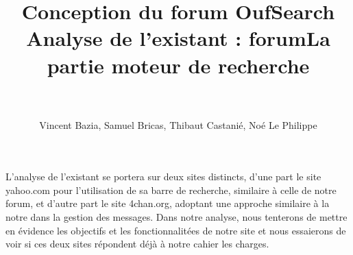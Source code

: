 \documentclass [a4 paper,11pt]{report}
\title{\textbf{Conception du forum OufSearch}\\Analyse de l'existant : forum}
\author{Vincent Bazia, Samuel Bricas, Thibaut Castanié, Noé Le Philippe}
\date{}
\begin{document}
\maketitle
\newpage
\paragraph{}
L'analyse de l'existant se portera sur deux sites distincts, d'une part le site yahoo.com pour l'utilisation de sa barre de recherche, similaire à celle de notre forum, et d'autre part le site 4chan.org, adoptant une approche similaire à la notre dans la gestion des messages. Dans notre analyse, nous tenterons de mettre en évidence les objectifs et les fonctionnalitées de notre site et nous essaierons de voir si ces deux sites répondent déjà à notre cahier les charges.
\paragraph{}
\title{\textbf{La partie moteur de recherche \\\\}}
\end{document}
